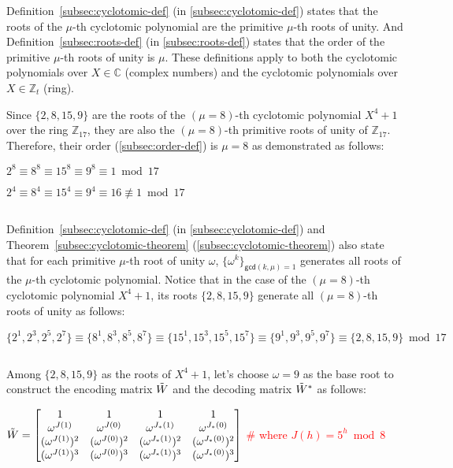 $ $

Definition~\ref*{subsec:cyclotomic-def} (in \autoref{subsec:cyclotomic-def}) states that the roots of the $\mu$-th cyclotomic polynomial are the primitive $\mu$-th roots of unity. And Definition~\ref*{subsec:roots-def} (in \autoref{subsec:roots-def}) states that the order of the primitive $\mu$-th roots of unity is $\mu$. These definitions apply to both the cyclotomic polynomials over $X\in\mathbb{C}$ (complex numbers) and the cyclotomic polynomials over $X \in \mathbb{Z}_t$ (ring). 

Since $\{2, 8, 15, 9\}$ are the roots of the $(\mu=8)$-th cyclotomic polynomial $X^4 + 1$ over the ring $\mathbb{Z}_{17}$, they are also the $(\mu=8)$-th primitive roots of unity of $\mathbb{Z}_{17}$. Therefore, their order (\autoref{subsec:order-def}) is $\mu=8$ as demonstrated as follows: 

$2^8 \equiv 8^8 \equiv 15^8 \equiv 9^8 \equiv 1 \bmod 17$

$2^4 \equiv 8^4 \equiv 15^4 \equiv 9^4 \equiv 16 \not\equiv 1 \bmod 17$

$ $

Definition~\ref*{subsec:cyclotomic-def} (in \autoref{subsec:cyclotomic-def}) and Theorem~\ref*{subsec:cyclotomic-theorem} (\autoref{subsec:cyclotomic-theorem}) also state that for each primitive $\mu$-th root of unity $\omega$, $\{\omega^k\}_{\textsf{gcd}(k, \mu) = 1}$ generates all roots of the $\mu$-th cyclotomic polynomial. Notice that in the case of the $(\mu=8)$-th cyclotomic polynomial $X^4 + 1$, its roots $\{2, 8, 15, 9\}$ generate all $(\mu=8)$-th roots of unity as follows:

$\{2^1, 2^3, 2^5, 2^7\} \equiv \{8^1, 8^3, 8^5, 8^7\} \equiv \{15^1, 15^3, 15^5, 15^7\} \equiv \{9^1, 9^3, 9^5, 9^7\} \equiv \{2, 8, 15, 9\} \bmod 17$

$ $

Among $\{2, 8, 15, 9\}$ as the roots of $X^4 + 1$, let's choose $\omega = 9$ as the base root to construct the encoding matrix $\tilde{W}$ and the decoding matrix $\tilde{W}^*$ as follows: 

$\tilde{W} = \begin{bmatrix}
1 & 1 & 1 & 1\\
\omega^{J(1)} & \omega^{J(0)} & \omega^{J_*(1)} & \omega^{J_*(0)}\\
(\omega^{J(1)})^2 & (\omega^{J(0)})^2 & (\omega^{J_*(1)})^2 & (\omega^{J_*(0)})^2\\
(\omega^{J(1)})^3 & (\omega^{J(0)})^3 & (\omega^{J_*(1)})^3 & (\omega^{J_*(0)})^3\\
\end{bmatrix}$ \textcolor{red}{\text{ } \# where $J(h) = 5^h \bmod 8$}

